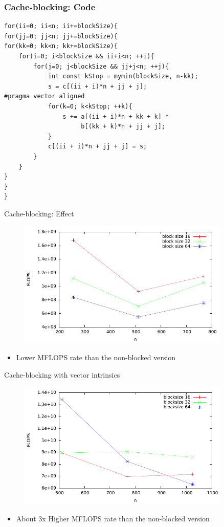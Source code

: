 \begin{frame}[fragile]
\frametitle{Cache-blocking: Code}
\codestylec
\begin{lstlisting}
for(ii=0; ii<n; ii+=blockSize){
for(jj=0; jj<n; jj+=blockSize){
for(kk=0; kk<n; kk+=blockSize){
    for(i=0; i<blockSize && ii+i<n; ++i){
        for(j=0; j<blockSize && jj+j<n; ++j){
            int const kStop = mymin(blockSize, n-kk);
            s = c[(ii + i)*n + jj + j];
#pragma vector aligned
            for(k=0; k<kStop; ++k){
                s += a[(ii + i)*n + kk + k] * 
                     b[(kk + k)*n + jj + j];
            }
            c[(ii + i)*n + jj + j] = s;
        }
    }
}
}
}
\end{lstlisting}
\end{frame}

\begin{frame}{Cache-blocking: Effect}
\begin{figure}[h]
  \begin{center}
    \includegraphics[width=0.9\textwidth]{../graphics/graph_blocked_flops.pdf}
  \end{center}
\end{figure}
\begin{itemize}
\item Lower MFLOPS rate than the non-blocked version
\end{itemize}
\end{frame}

\begin{frame}{Cache-blocking with vector intrinsics}
\begin{figure}[h]
  \begin{center}
    \includegraphics[width=0.9\textwidth]{../graphics/graph_avx.pdf}
  \end{center}
\end{figure}
\begin{itemize}
\item About 3x Higher MFLOPS rate than the non-blocked version
\end{itemize}
\end{frame}
